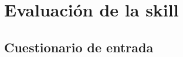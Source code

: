 
\chapter{Evaluación de la skill}
\label{Anexo2}


\section{Cuestionario de entrada}
\label{B1Anexo}

